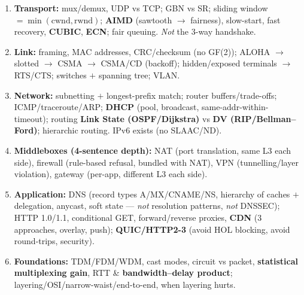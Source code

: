 \documentclass[11pt,a4paper]{article}
\begin{document}
\begin{must}
\begin{enumerate}[leftmargin=*,itemsep=2pt]
  \item \textbf{Transport:} mux/demux, UDP vs TCP; GBN vs SR; sliding window $=\min(\text{cwnd},\text{rwnd})$; \textbf{AIMD} (sawtooth $\to$ fairness), slow-start, fast recovery, \textbf{CUBIC}, \textbf{ECN}; fair queuing. \emph{Not} the 3-way handshake.
  \item \textbf{Link:} framing, MAC addresses, CRC/checksum (no GF(2)); ALOHA $\to$ slotted $\to$ CSMA $\to$ CSMA/CD (backoff); hidden/exposed terminals $\to$ RTS/CTS; switches $+$ spanning tree; VLAN.
  \item \textbf{Network:} subnetting $+$ longest-prefix match; router buffers/trade-offs; ICMP/traceroute/ARP; \textbf{DHCP} (pool, broadcast, same-addr-within-timeout); routing \textbf{Link State (OSPF/Dijkstra)} vs \textbf{DV (RIP/Bellman--Ford)}; hierarchic routing. IPv6 exists (no SLAAC/ND).
  \item \textbf{Middleboxes (4-sentence depth):} NAT (port translation, same L3 each side), firewall (rule-based refusal, bundled with NAT), VPN (tunnelling/layer violation), gateway (per-app, different L3 each side).
  \item \textbf{Application:} DNS (record types A/MX/CNAME/NS, hierarchy of caches $+$ delegation, anycast, soft state --- \emph{not} resolution patterns, \emph{not} DNSSEC); HTTP 1.0/1.1, conditional GET, forward/reverse proxies, \textbf{CDN} (3 approaches, overlay, push); \textbf{QUIC/HTTP2-3} (avoid HOL blocking, avoid round-trips, security).
  \item \textbf{Foundations:} TDM/FDM/WDM, cast modes, circuit vs packet, \textbf{statistical multiplexing gain}, RTT \& \textbf{bandwidth--delay product}; layering/OSI/narrow-waist/end-to-end, when layering hurts.
\end{enumerate}
\end{must}
\end{document}
